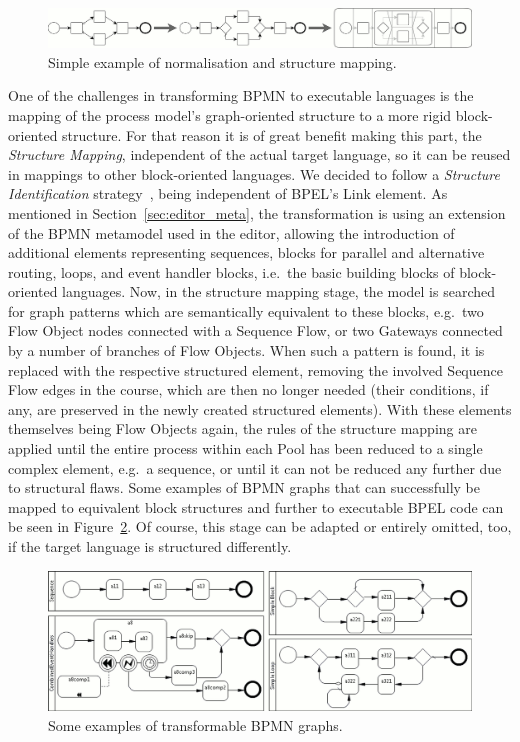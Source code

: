 \begin{figure}%
	\centering
	\includegraphics[width=\textwidth]{img/norm_struc_2.png}
	\caption{Simple example of normalisation and structure mapping.}
	\label{fig:norm_struc}
\end{figure}

One of the challenges in transforming BPMN to executable languages is the mapping of the process model's graph-oriented structure to a more rigid block-oriented structure.  For that reason it is of great benefit making this part, the \emph{Structure Mapping}, independent of the actual target language, so it can be reused in mappings to other block-oriented languages.  We decided to follow a \emph{Structure Identification} strategy~\cite{mendling2005transformation}, being independent of BPEL's Link element.  As mentioned in Section~\ref{sec:editor_meta}, the transformation is using an extension of the BPMN metamodel used in the editor, allowing the introduction of additional elements representing sequences, blocks for parallel and alternative routing, loops, and event handler blocks, i.e.\ the basic building blocks of block-oriented languages.  Now, in the structure mapping stage, the model is searched for graph patterns which are semantically equivalent to these blocks, e.g.\ two Flow Object nodes connected with a Sequence Flow, or two Gateways connected by a number of branches of Flow Objects.  When such a pattern is found, it is replaced with the respective structured element, removing the involved Sequence Flow edges in the course, which are then no longer needed (their conditions, if any, are preserved in the newly created structured elements).  With these elements themselves being Flow Objects again, the rules of the structure mapping are applied until the entire process within each Pool has been reduced to a single complex element, e.g.\ a sequence, or until it can not be reduced any further due to structural flaws.  Some examples of BPMN graphs that can successfully be mapped to equivalent block structures and further to executable BPEL code can be seen in Figure~\ref{fig:structures}.  Of course, this stage can be adapted or entirely omitted, too, if the target language is structured differently.

\begin{figure}%
	\centering
	\includegraphics[width=\textwidth]{img/structures.png}
	\caption{Some examples of transformable BPMN graphs.}
	\label{fig:structures}
\end{figure}

